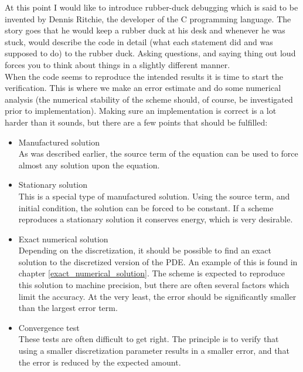  
\noindent At this point I would like to introduce rubber-duck debugging which is said to be invented by Dennis Ritchie, the developer of the C programming language. 
The story goes that he would keep a rubber duck at his desk and whenever he was stuck, would describe the code in detail (what each statement did and was supposed to do) to the rubber duck. 
Asking questions, and saying thing out loud forces you to think about things in a slightly different manner. \\

\noindent When the code seems to reproduce the intended results it is time to start the verification. 
This is where we make an error estimate and do some numerical analysis (the numerical stability of the scheme should, of course, be investigated prior to implementation). 
Making sure an implementation is correct is a lot harder than it sounds, but there are a few points that should be fulfilled:

\begin{itemize}
 \item Manufactured solution\\
 As was described earlier, the source term of the equation can be used to force almost any solution upon the equation. 
 
 \item Stationary solution\\
 This is a special type of manufactured solution. Using the source term, and initial condition, the solution can be forced to be constant. 
 If a scheme reproduces a stationary solution it conserves energy, which is very desirable.
 \item Exact numerical solution\\
 Depending on the discretization, it should be possible to find an exact solution to the discretized version of the PDE. 
 An example of this is found in chapter \ref{exact_numerical_solution}. 
 The scheme is expected to reproduce this solution to machine precision, but there are often several factors which limit the accuracy. 
 At the very least, the error should be significantly smaller than the largest error term. \\
 \item Convergence test\\
 These tests are often difficult to get right. 
 The principle is to verify that using a smaller discretization parameter results in a smaller error, and that the error is reduced by the expected amount. 
\end{itemize}


